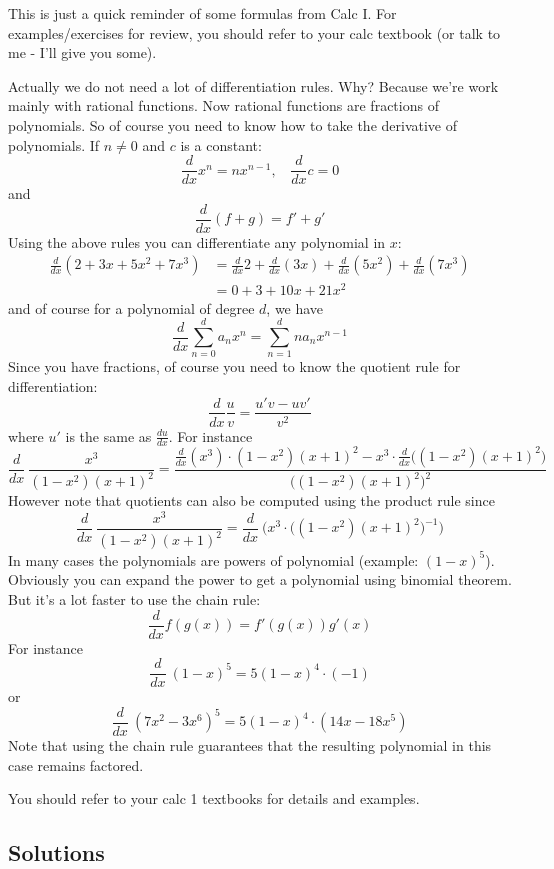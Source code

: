 This is just a quick reminder of some formulas from Calc I.
For examples/exercises for review, 
you should refer to your calc textbook (or talk
to me - I'll give you some).

Actually we do not need a lot of differentiation rules.
Why? 
Because we're work mainly with 
rational functions.
Now rational functions are fractions of polynomials.
So of course you need to know how to take the derivative
of polynomials. If $n \neq 0$ and $c$ is a constant:
\[
\frac{d}{dx} x^n = n x^{n-1}, \,\,\,\,\ \frac{d}{dx} c = 0
\]
and 
\[
\frac{d}{dx} (f + g) = f' + g'
\]
Using the above rules you can differentiate any polynomial in $x$:
\begin{align*}
\frac{d}{dx} (2 + 3x + 5x^2 + 7x^3)
&= \frac{d}{dx} 2 + \frac{d}{dx} (3x) +  \frac{d}{dx}(5x^2) + 
\frac{d}{dx} (7x^3) \\
&= 0 + 3 +  10x + 21x^2
\end{align*}
and of course for a polynomial of degree $d$, we have
\[
\frac{d}{dx} \sum_{n=0}^d a_n x^n = \sum_{n=1}^d na_nx^{n-1}
\]
Since you have fractions, of course you need to know 
the quotient rule for differentiation:
\[
\frac{d}{dx} \frac{u}{v} = 
\frac{u' v - uv'}{v^2}
\]
where $u'$ is the same as $\frac{du}{dx}$.
For instance
\[
\frac{d}{dx} \ \frac{x^3}{(1 - x^2)(x+1)^2}
=
\frac{
\frac{d}{dx}(x^3) \cdot (1 - x^2)(x+1)^2
- x^3 \cdot \frac{d}{dx} \bigl( (1 - x^2)(x+1)^2 \bigr)
}
{\bigl( (1 - x^2)(x+1)^2 \bigr)^2}
\]
However note that quotients can also be computed using
the product rule since
\[
\frac{d}{dx} \ \frac{x^3}{(1 - x^2)(x+1)^2}
=
\frac{d}{dx} \ 
\biggl(
x^3 \cdot \bigl( (1 - x^2)(x+1)^2 \bigr)^{-1}
\biggr)
\]
In many cases the polynomials are powers of polynomial
(example: $(1 - x)^5$). 
Obviously you can expand the power to get a 
polynomial using binomial theorem.
But it's a lot faster to use the chain rule:
\[
\frac{d}{dx} f(g(x)) = f'(g(x)) g'(x)
\]
For instance
\[
\frac{d}{dx} \ (1-x)^5 = 5(1-x)^4 \cdot (-1)
\]
or
\[
\frac{d}{dx} \ (7x^2-3x^6)^5 = 5(1-x)^4 \cdot (14x - 18x^5)
\]
Note that using the chain rule guarantees that the resulting
polynomial in this case remains factored.

You should refer to your calc 1 textbooks for details and examples.

\newpage
\subsection*{Solutions}
